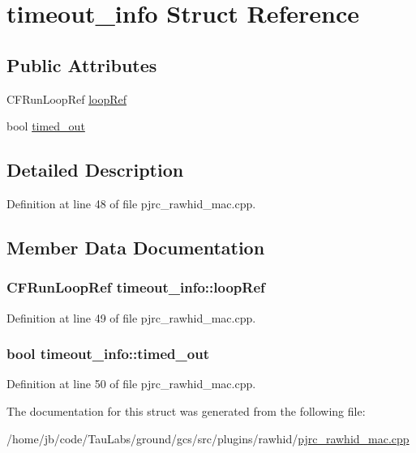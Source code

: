 \hypertarget{structtimeout__info}{\section{timeout\-\_\-info \-Struct \-Reference}
\label{structtimeout__info}
}
\subsection*{\-Public \-Attributes}
\begin{DoxyCompactItemize}
\item 
\-C\-F\-Run\-Loop\-Ref \hyperlink{structtimeout__info_a690f0ac4bca1156238d6f690e64c9f45}{loop\-Ref}
\item 
bool \hyperlink{structtimeout__info_a724828dccca04c73d6af31e92a6b4eda}{timed\-\_\-out}
\end{DoxyCompactItemize}


\subsection{\-Detailed \-Description}


\-Definition at line 48 of file pjrc\-\_\-rawhid\-\_\-mac.\-cpp.



\subsection{\-Member \-Data \-Documentation}
\hypertarget{structtimeout__info_a690f0ac4bca1156238d6f690e64c9f45}{
\subsubsection[{loop\-Ref}]{\setlength{\rightskip}{0pt plus 5cm}\-C\-F\-Run\-Loop\-Ref {\bf timeout\-\_\-info\-::loop\-Ref}}}\label{structtimeout__info_a690f0ac4bca1156238d6f690e64c9f45}


\-Definition at line 49 of file pjrc\-\_\-rawhid\-\_\-mac.\-cpp.

\hypertarget{structtimeout__info_a724828dccca04c73d6af31e92a6b4eda}{
\subsubsection[{timed\-\_\-out}]{\setlength{\rightskip}{0pt plus 5cm}bool {\bf timeout\-\_\-info\-::timed\-\_\-out}}}\label{structtimeout__info_a724828dccca04c73d6af31e92a6b4eda}


\-Definition at line 50 of file pjrc\-\_\-rawhid\-\_\-mac.\-cpp.



\-The documentation for this struct was generated from the following file\-:\begin{DoxyCompactItemize}
\item 
/home/jb/code/\-Tau\-Labs/ground/gcs/src/plugins/rawhid/\hyperlink{pjrc__rawhid__mac_8cpp}{pjrc\-\_\-rawhid\-\_\-mac.\-cpp}\end{DoxyCompactItemize}
